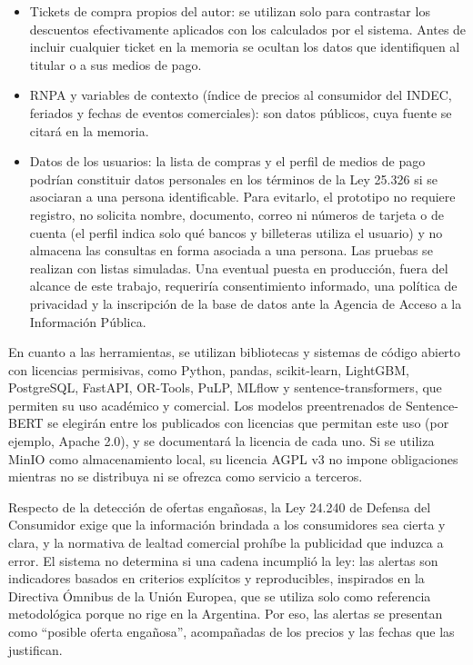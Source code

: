 \documentclass[
11pt, %
]{charter}
\begin{document}
\begin{itemize}
	\item Tickets de compra propios del autor: se utilizan solo para contrastar los descuentos efectivamente aplicados con los calculados por el sistema. Antes de incluir cualquier ticket en la memoria se ocultan los datos que identifiquen al titular o a sus medios de pago.
	\item RNPA y variables de contexto (índice de precios al consumidor del INDEC, feriados y fechas de eventos comerciales): son datos públicos, cuya fuente se citará en la memoria.
	\item Datos de los usuarios: la lista de compras y el perfil de medios de pago podrían constituir datos personales en los términos de la Ley 25.326 si se asociaran a una persona identificable. Para evitarlo, el prototipo no requiere registro, no solicita nombre, documento, correo ni números de tarjeta o de cuenta (el perfil indica solo qué bancos y billeteras utiliza el usuario) y no almacena las consultas en forma asociada a una persona. Las pruebas se realizan con listas simuladas. Una eventual puesta en producción, fuera del alcance de este trabajo, requeriría consentimiento informado, una política de privacidad y la inscripción de la base de datos ante la Agencia de Acceso a la Información Pública.
\end{itemize}

En cuanto a las herramientas, se utilizan bibliotecas y sistemas de código abierto con licencias permisivas, como Python, pandas, scikit-learn, LightGBM, PostgreSQL, FastAPI, OR-Tools, PuLP, MLflow y sentence-transformers, que permiten su uso académico y comercial. Los modelos preentrenados de Sentence-BERT se elegirán entre los publicados con licencias que permitan este uso (por ejemplo, Apache 2.0), y se documentará la licencia de cada uno. Si se utiliza MinIO como almacenamiento local, su licencia AGPL v3 no impone obligaciones mientras no se distribuya ni se ofrezca como servicio a terceros.

Respecto de la detección de ofertas engañosas, la Ley 24.240 de Defensa del Consumidor exige que la información brindada a los consumidores sea cierta y clara, y la normativa de lealtad comercial prohíbe la publicidad que induzca a error. El sistema no determina si una cadena incumplió la ley: las alertas son indicadores basados en criterios explícitos y reproducibles, inspirados en la Directiva Ómnibus de la Unión Europea, que se utiliza solo como referencia metodológica porque no rige en la Argentina. Por eso, las alertas se presentan como ``posible oferta engañosa'', acompañadas de los precios y las fechas que las justifican.
\end{document}
